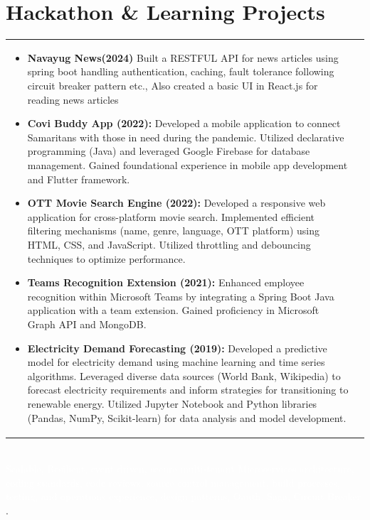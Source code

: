 \documentclass[a4paper,8pt]{article}
\begin{document}
\section{\color[HTML]{0000FF}Hackathon \& Learning Projects}
\begin{tabularx}{\linewidth}{ @{}l @{\extracolsep{\fill}} r@{} }
\begin{minipage}[t]{\linewidth}
    \begin{itemize}[nosep,after=\strut, leftmargin=2em, itemsep=2pt]
        \item \textbf{Navayug News(2024)} Built a RESTFUL API for news articles using spring boot handling authentication, caching, fault tolerance following circuit breaker pattern etc., Also created a basic UI in React.js for reading news articles
        \item \textbf{Covi Buddy App (2022):} Developed a mobile application to connect Samaritans with those in need during the pandemic. Utilized declarative programming (Java) and leveraged Google Firebase for database management. Gained foundational experience in mobile app development and Flutter framework.
        \item \textbf{OTT Movie Search Engine (2022):} Developed a responsive web application for cross-platform movie search. Implemented efficient filtering mechanisms (name, genre, language, OTT platform) using HTML, CSS, and JavaScript. Utilized throttling and debouncing techniques to optimize performance.
        \item \textbf{Teams Recognition Extension (2021):} Enhanced employee recognition within Microsoft Teams by integrating a Spring Boot Java application with a team extension. Gained proficiency in Microsoft Graph API and MongoDB.
        \item \textbf{Electricity Demand Forecasting (2019):} Developed a predictive model for electricity demand using machine learning and time series algorithms. Leveraged diverse data sources (World Bank, Wikipedia) to forecast electricity requirements and inform strategies for transitioning to renewable energy. Utilized Jupyter Notebook and Python libraries (Pandas, NumPy, Scikit-learn) for data analysis and model development.
    \end{itemize}
    \end{minipage}\vspace{6pt}
\end{tabularx}\\[3pt]

\textcolor{white} {Scalable, Resilient, event driven, secure multi-tenant Microservices architecture, coding standards, code reviews, source control management, build processes, testing, and operations experience, design patterns, Oauth, Saga, Circuit Breaker}
.
\end{document}
